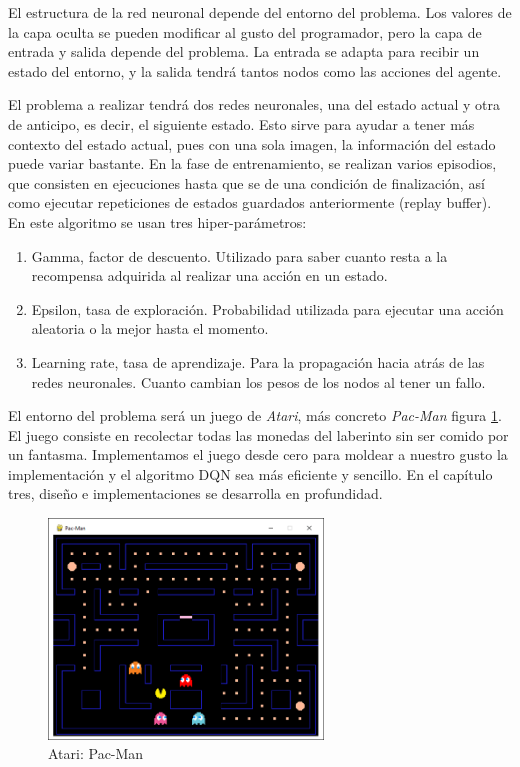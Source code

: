		El estructura de la red neuronal depende del entorno del problema. Los valores de la capa oculta se pueden modificar al gusto del programador, pero la capa de entrada y salida depende del problema. La entrada se adapta para recibir un estado del entorno, y la salida tendrá tantos nodos como las acciones del agente. 
		
		El problema a realizar tendrá dos redes neuronales, una del estado actual y otra de anticipo, es decir, el siguiente estado. Esto sirve para ayudar a tener más contexto del estado actual, pues con una sola imagen, la información del estado puede variar bastante. En la fase de entrenamiento, se realizan varios episodios, que consisten en ejecuciones hasta que se de una condición de finalización, así como ejecutar repeticiones de estados guardados anteriormente (replay buffer). En este algoritmo se usan tres hiper-parámetros: 
		\begin{enumerate}
			\item Gamma, factor de descuento. Utilizado para saber cuanto resta a la recompensa adquirida al realizar una acción en un estado.
			\item Epsilon, tasa de exploración. Probabilidad utilizada para ejecutar una acción aleatoria o la mejor hasta el momento.
			\item Learning rate, tasa de aprendizaje. Para la propagación hacia atrás de las redes neuronales. Cuanto cambian los pesos de los nodos al tener un fallo.
		\end{enumerate}	
		
		
		
		El entorno del problema será un juego de \textit{Atari}, más concreto \textit{Pac-Man} figura \ref{fig:pacman}. El juego consiste en recolectar todas las monedas del laberinto sin ser comido por un fantasma. Implementamos el juego desde cero para moldear a nuestro gusto la implementación y el algoritmo DQN sea más eficiente y sencillo. En el capítulo tres, diseño e implementaciones se desarrolla en profundidad.
		
		\begin{figure}[!h]			
			\centering
			\includegraphics[width=0.65\textwidth]{images/chapter_2/pacman}	
			\caption{Atari: Pac-Man}
			\label{fig:pacman}
		\end{figure}
		
